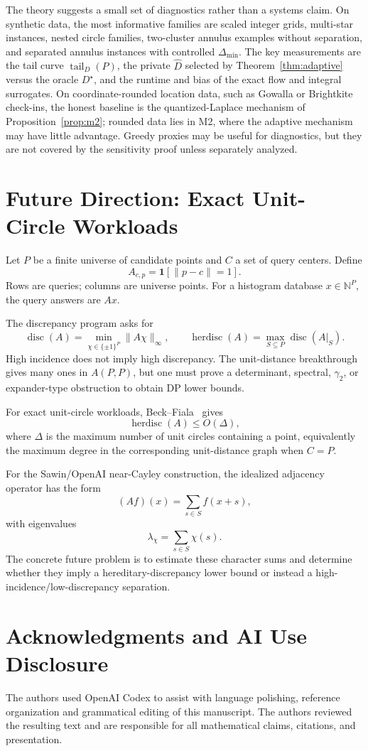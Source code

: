 \documentclass[11pt]{article}
\DeclareMathOperator{\disc}{disc}
\DeclareMathOperator{\herdisc}{herdisc}
\newcommand{\tail}{\operatorname{tail}}
\begin{document}
The theory suggests a small set of diagnostics rather than a systems claim. On synthetic data, the most informative families are scaled integer grids, multi-star instances, nested circle families, two-cluster annulus examples without separation, and separated annulus instances with controlled \(\Delta_{\min}\). The key measurements are the tail curve \(\tail_D(P)\), the private \(\widehat D\) selected by Theorem~\ref{thm:adaptive} versus the oracle \(D^\star\), and the runtime and bias of the exact flow and integral surrogates. On coordinate-rounded location data, such as Gowalla or Brightkite check-ins, the honest baseline is the quantized-Laplace mechanism of Proposition~\ref{prop:m2}; rounded data lies in M2, where the adaptive mechanism may have little advantage. Greedy proxies may be useful for diagnostics, but they are not covered by the sensitivity proof unless separately analyzed.

\appendix
\section{Future Direction: Exact Unit-Circle Workloads}
\label{app:route2}

Let \(P\) be a finite universe of candidate points and \(C\) a set of query centers. Define
\[
A_{c,p}=\mathbf{1}[\|p-c\|=1].
\]
Rows are queries; columns are universe points. For a histogram database \(x\in \mathbb{N}^P\), the query answers are \(Ax\).

The discrepancy program asks for
\[
\disc(A)=\min_{\chi\in\{\pm1\}^P}\|A\chi\|_\infty,\qquad
\herdisc(A)=\max_{S\subseteq P}\disc(A|_S).
\]
High incidence does not imply high discrepancy. The unit-distance breakthrough gives many ones in \(A(P,P)\), but one must prove a determinant, spectral, \(\gamma_2\), or expander-type obstruction to obtain DP lower bounds.

For exact unit-circle workloads, Beck--Fiala~\cite{BeckFiala81} gives
\[
\herdisc(A)\le O(\Delta),
\]
where \(\Delta\) is the maximum number of unit circles containing a point, equivalently the maximum degree in the corresponding unit-distance graph when \(C=P\).

For the Sawin/OpenAI near-Cayley construction, the idealized adjacency operator has the form
\[
(Af)(x)=\sum_{s\in S} f(x+s),
\]
with eigenvalues
\[
\lambda_\chi=\sum_{s\in S}\chi(s).
\]
The concrete future problem is to estimate these character sums and determine whether they imply a hereditary-discrepancy lower bound or instead a high-incidence/low-discrepancy separation.

\section*{Acknowledgments and AI Use Disclosure}

The authors used OpenAI Codex to assist with language polishing, reference organization and grammatical editing of this manuscript. The authors reviewed the resulting text and are responsible for all mathematical claims, citations, and presentation.



\end{document}
